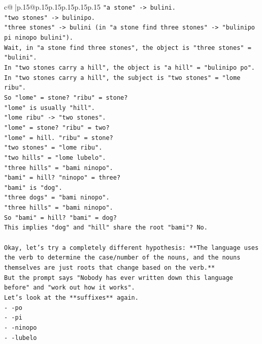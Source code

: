 \documentclass{article}
\begin{document}
{\begin{supertabular}{c@{$\;$}|p{.15\linewidth}@{}p{.15\linewidth}p{.15\linewidth}p{.15\linewidth}p{.15\linewidth}p{.15\linewidth}}
{{{\texttt{"a stone" {-}> bulini.} \\
\texttt{"two stones" {-}> bulinipo.} \\
\texttt{"three stones" {-}> bulini (in "a stone find three stones" {-}> "bulinipo pi ninopo bulini").} \\
\texttt{Wait, in "a stone find three stones", the object is "three stones" = "bulini".} \\
\texttt{In "two stones carry a hill", the object is "a hill" = "bulinipo po".} \\
\texttt{In "two stones carry a hill", the subject is "two stones" = "lome ribu".} \\
\texttt{So "lome" = stone? "ribu" = stone?} \\
\texttt{"lome" is usually "hill".} \\
\texttt{"lome ribu" {-}> "two stones".} \\
\texttt{"lome" = stone? "ribu" = two?} \\
\texttt{"lome" = hill. "ribu" = stone?} \\
\texttt{"two stones" = "lome ribu".} \\
\texttt{"two hills" = "lome lubelo".} \\
\texttt{"three hills" = "bami ninopo".} \\
\texttt{"bami" = hill? "ninopo" = three?} \\
\texttt{"bami" is "dog".} \\
\texttt{"three dogs" = "bami ninopo".} \\
\texttt{"three hills" = "bami ninopo".} \\
\texttt{So "bami" = hill? "bami" = dog?} \\
\texttt{This implies "dog" and "hill" share the root "bami"? No.} \\
\\ 
\texttt{Okay, let's try a completely different hypothesis: **The language uses the verb to determine the case/number of the nouns, and the nouns themselves are just roots that change based on the verb.**} \\
\texttt{But the prompt says "Nobody has ever written down this language before" and "work out how it works".} \\
\texttt{Let's look at the **suffixes** again.} \\
\texttt{{-} {-}po} \\
\texttt{{-} {-}pi} \\
\texttt{{-} {-}ninopo} \\
\texttt{{-} {-}lubelo} \\
}}}
\end{supertabular}}
\end{document}
